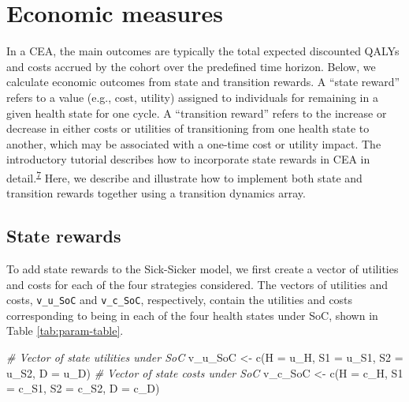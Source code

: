 \documentclass[
]{article}
\newenvironment{Shaded}{\begin{snugshade}}{\end{snugshade}}
\newcommand{\AttributeTok}[1]{\textcolor[rgb]{0.77,0.63,0.00}{#1}}
\newcommand{\CommentTok}[1]{\textcolor[rgb]{0.56,0.35,0.01}{\textit{#1}}}
\newcommand{\FunctionTok}[1]{\textcolor[rgb]{0.00,0.00,0.00}{#1}}
\newcommand{\NormalTok}[1]{#1}
\newcommand{\OtherTok}[1]{\textcolor[rgb]{0.56,0.35,0.01}{#1}}
\begin{document}
\hypertarget{economic-measures}{%
\section{Economic measures}\label{economic-measures}}

In a CEA, the main outcomes are typically the total expected discounted QALYs and costs accrued by the cohort over the predefined time horizon. Below, we calculate economic outcomes from state and transition rewards. A ``state reward'' refers to a value (e.g., cost, utility) assigned to individuals for remaining in a given health state for one cycle. A ``transition reward'' refers to the increase or decrease in either costs or utilities of transitioning from one health state to another, which may be associated with a one-time cost or utility impact. The introductory tutorial describes how to incorporate state rewards in CEA in detail.\textsuperscript{\protect\hyperlink{ref-Alarid-Escudero2022b}{7}} Here, we describe and illustrate how to implement both state and transition rewards together using a transition dynamics array.

\hypertarget{state-rewards}{%
\subsection{State rewards}\label{state-rewards}}

To add state rewards to the Sick-Sicker model, we first create a vector of utilities and costs for each of the four strategies considered. The vectors of utilities and costs, \texttt{v\_u\_SoC} and \texttt{v\_c\_SoC}, respectively, contain the utilities and costs corresponding to being in each of the four health states under SoC, shown in Table \ref{tab:param-table}.

\begin{Shaded}
\begin{Highlighting}[]
\CommentTok{\# Vector of state utilities under SoC}
\NormalTok{v\_u\_SoC }\OtherTok{\textless{}{-}} \FunctionTok{c}\NormalTok{(}\AttributeTok{H =}\NormalTok{ u\_H, }\AttributeTok{S1 =}\NormalTok{ u\_S1, }\AttributeTok{S2 =}\NormalTok{ u\_S2, }\AttributeTok{D =}\NormalTok{ u\_D)}
\CommentTok{\# Vector of state costs under SoC}
\NormalTok{v\_c\_SoC }\OtherTok{\textless{}{-}} \FunctionTok{c}\NormalTok{(}\AttributeTok{H =}\NormalTok{ c\_H, }\AttributeTok{S1 =}\NormalTok{ c\_S1, }\AttributeTok{S2 =}\NormalTok{ c\_S2, }\AttributeTok{D =}\NormalTok{ c\_D)}
\end{Highlighting}
\end{Shaded}
\end{document}
